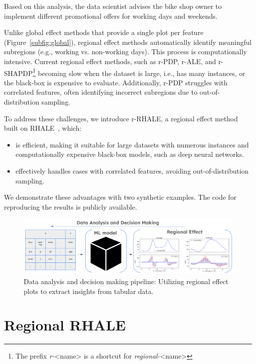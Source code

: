 \documentclass[
twocolumn,
]{ceurart}
\begin{document}
Based on this analysis, the data scientist advises the bike shop owner to implement different promotional offers for working days and weekends.

Unlike global effect methods that provide a single plot per feature (Figure~\ref{subfig:global}), regional effect methods automatically identify meaningful subregions (e.g., working vs. non-working days). This process is computationally intensive. Current regional effect methods, such as r-PDP, r-ALE, and r-SHAPDP\footnote{The prefix \textit{r-}<name> is a shortcut for \textit{regional-}<name>} becoming slow when the dataset is large, i.e., has many instances, or the black-box is expensive to evaluate. Additionally, r-PDP struggles with correlated features, often identifying incorrect subregions due to out-of-distribution sampling.

To address these challenges, we introduce r-RHALE, a regional effect method built on RHALE~\cite{gkolemis2023rhale, gkolemis22a}, which:

\begin{itemize}
\item is efficient, making it suitable for large datasets with numerous instances and computationally expensive black-box models, such as deep neural networks.
\item effectively handles cases with correlated features, avoiding out-of-distribution sampling.
\end{itemize}

We demonstrate these advantages with two synthetic examples. The code for reproducing the results is publicly available.

\begin{figure}[t]
    \centering
    \includegraphics[width=\textwidth]{figures/concept_image.png}
    \caption{Data analysis and decision making pipeline: Utilizing regional effect plots to extract insights from tabular data.}
    \label{fig:concept_figure}
\end{figure}

\section{Regional RHALE}
\end{document}
